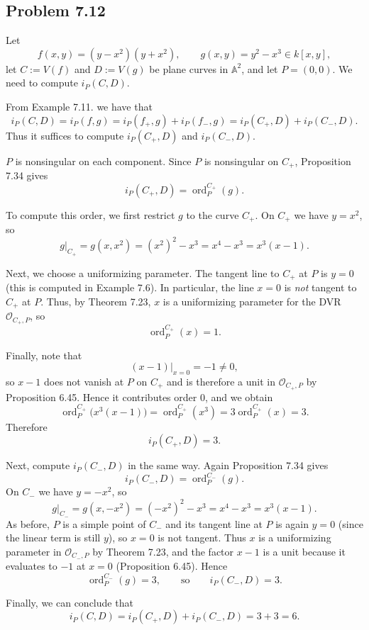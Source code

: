 \documentclass[a4paper,12pt,openany]{article}
\theoremstyle{plain}
\theoremstyle{definition}
\theoremstyle{remark}
\begin{document}
\subsection*{Problem 7.12}

Let
\[
f(x,y)=(y-x^{2})(y+x^{2}), \qquad g(x,y)=y^{2}-x^{3}\in k[x,y],
\]
let $C:=V(f)$ and $D:=V(g)$ be plane curves in $\mathbb{A}^{2}$, and let $P=(0,0)$.
We need to compute $i_{P}(C,D)$.

\medskip

From Example 7.11. we have that
\[
i_{P}(C,D)=i_{P}(f,g)=i_{P}(f_{+},g)+i_{P}(f_{-},g)
= i_{P}(C_{+},D)+i_{P}(C_{-},D).
\]
Thus it suffices to compute $i_{P}(C_{+},D)$ and $i_{P}(C_{-},D)$.

\medskip

$P$ is nonsingular on each component. Since $P$ is nonsingular on $C_{+}$, Proposition 7.34 gives
\[
i_{P}(C_{+},D)=\operatorname{ord}^{C_{+}}_{P}(g).
\]

To compute this order, we first restrict $g$ to the curve $C_{+}$.
On $C_{+}$ we have $y=x^{2}$, so
\[
g|_{C_{+}} = g(x,x^{2}) = (x^{2})^{2}-x^{3}
= x^{4}-x^{3}
= x^{3}(x-1).
\]

Next, we choose a uniformizing parameter.
The tangent line to $C_{+}$ at $P$ is $y=0$ (this is computed in Example 7.6).
In particular, the line $x=0$ is \emph{not} tangent to $C_{+}$ at $P$.
Thus, by Theorem 7.23, $x$ is a uniformizing parameter for the DVR $\mathcal{O}_{C_{+},P}$, so
\[
\operatorname{ord}^{C_{+}}_{P}(x)=1.
\]

Finally, note that
\[
(x-1)\big|_{x=0}=-1\neq 0,
\]
so $x-1$ does not vanish at $P$ on $C_{+}$ and is therefore a unit in $\mathcal{O}_{C_{+},P}$ by Proposition 6.45.
Hence it contributes order $0$, and we obtain
\[
\operatorname{ord}^{C_{+}}_{P}\bigl(x^{3}(x-1)\bigr)
=\operatorname{ord}^{C_{+}}_{P}(x^{3})
=3\operatorname{ord}^{C_{+}}_{P}(x)=3.
\]
Therefore
\[
i_{P}(C_{+},D)=3.
\]

\medskip

Next, compute $i_{P}(C_{-},D)$ in the same way.
Again Proposition 7.34 gives
\[
i_{P}(C_{-},D)=\operatorname{ord}^{C_{-}}_{P}(g).
\]
On $C_{-}$ we have $y=-x^{2}$, so
\[
g|_{C_{-}} = g(x,-x^{2}) = (-x^{2})^{2}-x^{3}
= x^{4}-x^{3}
= x^{3}(x-1).
\]
As before, $P$ is a simple point of $C_{-}$ and its tangent line at $P$ is again $y=0$ (since the linear term is still $y$),
so $x=0$ is not tangent. Thus $x$ is a uniformizing parameter in $\mathcal{O}_{C_{-},P}$ by Theorem 7.23, and the factor
$x-1$ is a unit because it evaluates to $-1$ at $x=0$ (Proposition 6.45). Hence
\[
\operatorname{ord}^{C_{-}}_{P}(g)=3,
\qquad\text{so}\qquad
i_{P}(C_{-},D)=3.
\]

\medskip

Finally, we can conclude that
\[
i_{P}(C,D)=i_{P}(C_{+},D)+i_{P}(C_{-},D)=3+3=6.
\]
\end{document}
